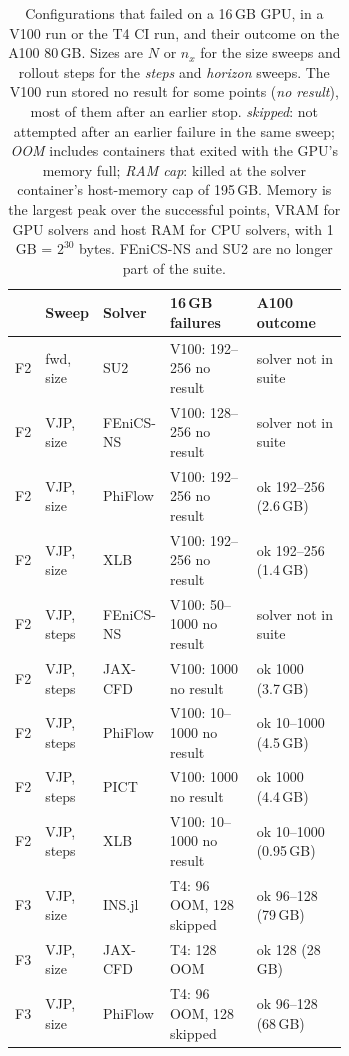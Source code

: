 \begin{table}[p]
  \centering\scriptsize
  \setlength{\tabcolsep}{3pt}
  \caption{Configurations that failed on a 16\,GB GPU, in a V100 run or the T4
    CI run, and their outcome on the A100 80\,GB. Sizes are $N$ or $n_x$ for the size sweeps and
    rollout steps for the \emph{steps} and \emph{horizon} sweeps. The V100 run stored
    no result for some points (\emph{no result}), most of them after an earlier stop.
    \emph{skipped}: not attempted after an earlier failure in the same sweep; \emph{OOM} includes containers that exited with the GPU's memory full; \emph{RAM cap}: killed at the solver container's host-memory cap of 195\,GB. Memory is the largest peak over the successful
    points, VRAM for GPU solvers and host RAM for CPU solvers, with 1\,GB = $2^{30}$ bytes.
    FEniCS-NS and SU2 are no longer part of the suite.}
  \label{tab:app:outcomes}
  \begin{tabular}{@{}l l l >{\raggedright\arraybackslash}p{0.33\linewidth} >{\raggedright\arraybackslash}p{0.33\linewidth}@{}}
    \toprule
    & \textbf{Sweep} & \textbf{Solver} & \textbf{16\,GB failures} & \textbf{A100 outcome} \\
    \midrule
      F2 & fwd, size & SU2 & V100: 192--256 no result & solver not in suite \\
      F2 & VJP, size & FEniCS-NS & V100: 128--256 no result & solver not in suite \\
      F2 & VJP, size & PhiFlow & V100: 192--256 no result & ok 192--256 (2.6\,GB) \\
      F2 & VJP, size & XLB & V100: 192--256 no result & ok 192--256 (1.4\,GB) \\
      F2 & VJP, steps & FEniCS-NS & V100: 50--1000 no result & solver not in suite \\
      F2 & VJP, steps & JAX-CFD & V100: 1000 no result & ok 1000 (3.7\,GB) \\
      F2 & VJP, steps & PhiFlow & V100: 10--1000 no result & ok 10--1000 (4.5\,GB) \\
      F2 & VJP, steps & PICT & V100: 1000 no result & ok 1000 (4.4\,GB) \\
      F2 & VJP, steps & XLB & V100: 10--1000 no result & ok 10--1000 (0.95\,GB) \\
    \midrule
      F3 & VJP, size & INS.jl & T4: 96 OOM, 128 skipped & ok 96--128 (79\,GB) \\
      F3 & VJP, size & JAX-CFD & T4: 128 OOM & ok 128 (28\,GB) \\
      F3 & VJP, size & PhiFlow & T4: 96 OOM, 128 skipped & ok 96--128 (68\,GB) \\

\end{tabular}
\end{table}
